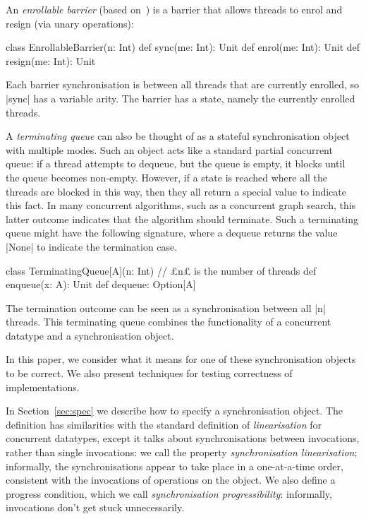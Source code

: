 An \emph{enrollable barrier} (based on~\cite{alting-barrier}) is a barrier
that allows threads to enrol and resign (via unary operations):
%
\begin{scala}
class EnrollableBarrier(n: Int){
  def sync(me: Int): Unit
  def enrol(me: Int): Unit
  def resign(me: Int): Unit
}
\end{scala} 
%
Each barrier synchronisation is between all threads that are currently
enrolled, so |sync| has a variable arity.  The barrier has a state, namely the
currently enrolled threads.

A \emph{terminating queue} can also be thought of as a stateful
synchronisation object with multiple modes.  Such an object acts like a
standard partial concurrent queue: if a thread attempts to dequeue, but the
queue is empty, it blocks until the queue becomes non-empty.  However, if a
state is reached where all the threads are blocked in this way, then they all
return a special value to indicate this fact.  In many concurrent algorithms,
such as a concurrent graph search, this latter outcome indicates that the
algorithm should terminate.  Such a terminating queue might have the
following signature, where a dequeue returns the value |None| to indicate the
termination case.
%
\begin{scala}
class TerminatingQueue[A](n: Int){ // £n£ is the number of threads   
  def enqueue(x: A): Unit
  def dequeue: Option[A]
}
\end{scala} 
%
The termination outcome can be seen as a synchronisation between all |n|
threads.  This terminating queue combines the functionality of a
concurrent datatype and a synchronisation object.



In this paper, we consider what it means for one of these synchronisation
objects to be correct.  We also present techniques for testing correctness of
implementations.

In Section~\ref{sec:spec} we describe how to specify a synchronisation object.
The definition has similarities with the standard definition of
\emph{linearisation} for concurrent datatypes, except it talks about
synchronisations between invocations, rather than single invocations: we call
the property \emph{synchronisation linearisation}; informally, the
synchronisations appear to take place in a one-at-a-time order, consistent
with the invocations of operations on the object.  We also define a progress
condition, which we call \emph{synchronisation progressibility}: informally,
invocations don't get stuck unnecessarily.

